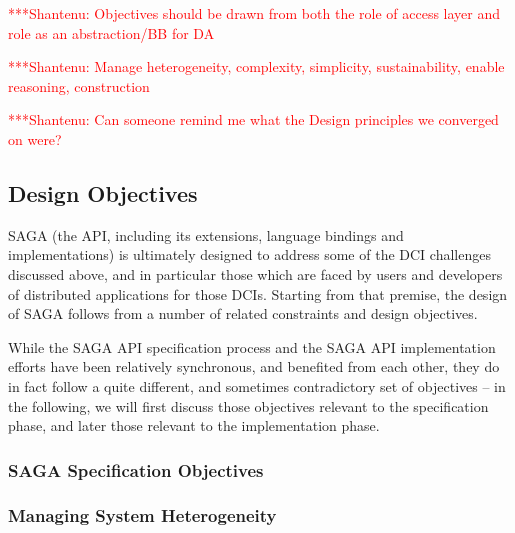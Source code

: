 \documentclass[a4paper,12pt]{article}
\newcommand{\jhanote}[1]{  {\textcolor{red}  { ***Shantenu: #1 }}}
\newcommand{\jhanote}[1]{}
\begin{document}

 \jhanote{Objectives should be drawn from both the role of access
   layer and role as an abstraction/BB for DA}

 \jhanote{Manage heterogeneity, complexity, simplicity,
   sustainability, enable reasoning, construction}

 \jhanote{Can someone remind me what the Design principles we
   converged on were?}

 \subsection{Design Objectives}


  SAGA (the API, including its extensions, language bindings and
  implementations) is ultimately designed to address some of the DCI
  challenges discussed above, and in particular those which are faced
  by users and developers of distributed applications for those DCIs.
  Starting from that premise, the design of SAGA follows from a number
  of related constraints and design objectives.

  While the SAGA API specification process and the SAGA API
  implementation efforts have been relatively synchronous, and
  benefited from each other, they do in fact follow a quite different,
  and sometimes contradictory set of objectives -- in the following,
  we will first discuss those objectives relevant to the specification
  phase, and later those relevant to the implementation phase.

  \subsubsection{SAGA Specification Objectives}
  \label{sec:obj.spec}

   \subsubsection*{Managing System Heterogeneity}
   \label{ssec:obj.heter}

\end{document}
